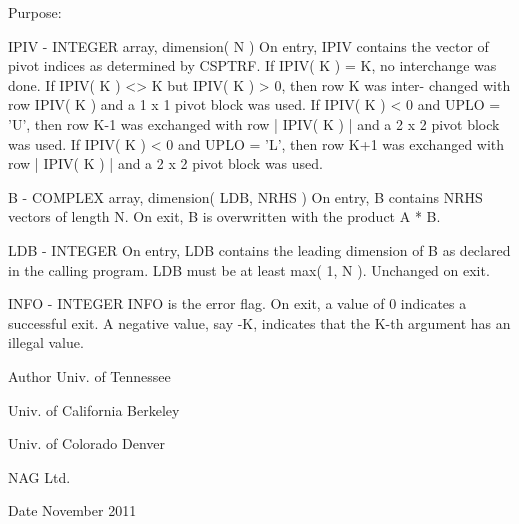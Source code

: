 \begin{DoxyParagraph}{Purpose\+: }
\begin{DoxyVerb}
  IPIV   - INTEGER array, dimension( N )
           On entry, IPIV contains the vector of pivot indices as
           determined by CSPTRF.
           If IPIV( K ) = K, no interchange was done.
           If IPIV( K ) <> K but IPIV( K ) > 0, then row K was inter-
           changed with row IPIV( K ) and a 1 x 1 pivot block was used.
           If IPIV( K ) < 0 and UPLO = 'U', then row K-1 was exchanged
           with row | IPIV( K ) | and a 2 x 2 pivot block was used.
           If IPIV( K ) < 0 and UPLO = 'L', then row K+1 was exchanged
           with row | IPIV( K ) | and a 2 x 2 pivot block was used.

  B      - COMPLEX array, dimension( LDB, NRHS )
           On entry, B contains NRHS vectors of length N.
           On exit, B is overwritten with the product A * B.

  LDB    - INTEGER
           On entry, LDB contains the leading dimension of B as
           declared in the calling program.  LDB must be at least
           max( 1, N ).
           Unchanged on exit.

  INFO   - INTEGER
           INFO is the error flag.
           On exit, a value of 0 indicates a successful exit.
           A negative value, say -K, indicates that the K-th argument
           has an illegal value.\end{DoxyVerb}
 
\end{DoxyParagraph}
\begin{DoxyAuthor}{Author}
Univ. of Tennessee 

Univ. of California Berkeley 

Univ. of Colorado Denver 

N\+A\+G Ltd. 
\end{DoxyAuthor}
\begin{DoxyDate}{Date}
November 2011 
\end{DoxyDate}
\hypertarget{group__complex__lin_gafa9175f598ca22a02c8cf24fcf034ede}{}
